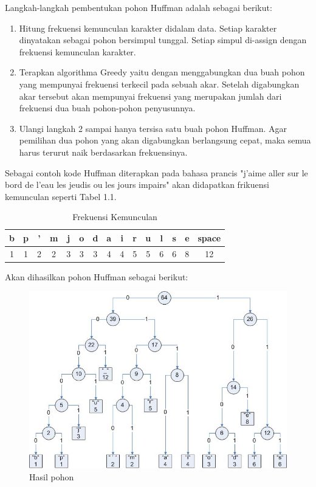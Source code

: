 Langkah-langkah pembentukan pohon Huffman adalah sebagai berikut:
\begin{enumerate}
\item Hitung frekuensi kemunculan karakter didalam data. Setiap karakter dinyatakan sebagai pohon bersimpul tunggal. Setiap simpul di-assign dengan frekuensi kemunculan karakter.
\item Terapkan algorithma Greedy yaitu dengan menggabungkan dua buah pohon yang mempunyai frekuensi terkecil pada sebuah akar. Setelah digabungkan akar tersebut akan mempunyai frekuensi yang merupakan jumlah dari frekuensi dua buah pohon-pohon penyusunnya.
\item Ulangi langkah 2 sampai hanya tersisa satu buah pohon Huffman. Agar pemilihan dua pohon yang akan digabungkan berlangsung cepat, maka semua harus terurut naik berdasarkan frekuensinya.
\end{enumerate}
Sebagai contoh kode Huffman diterapkan pada bahasa prancis "j'aime aller sur le bord de l'eau les jeudis ou les jours impairs" akan didapatkan frikuensi kemunculan seperti Tabel 1.1.

\begin{table}[h]
\begin{center}
\begin{tabular}{|c|c|c|c|c|c|c|c|c|c|c|c|c|c|c|}
\hline
b&p&'&m&j&o&d&a&i&r&u&l&s&e&space\\
\hline
1&1&2&2&3&3&3&4&4&5&5&6&6&8&12\\
\hline
\end{tabular}
\caption{Frekuensi Kemunculan}
\end{center}
\end{table}

Akan dihasilkan pohon Huffman sebagai berikut:

\begin{figure}[htbp]
\begin{center}
	\includegraphics[scale=0.6]{fig/sunario-3/Huffman.jpg}%
	\caption{Hasil pohon }%
	\label{fig:Huffman Tree}%
\end{center}
\end{figure}

